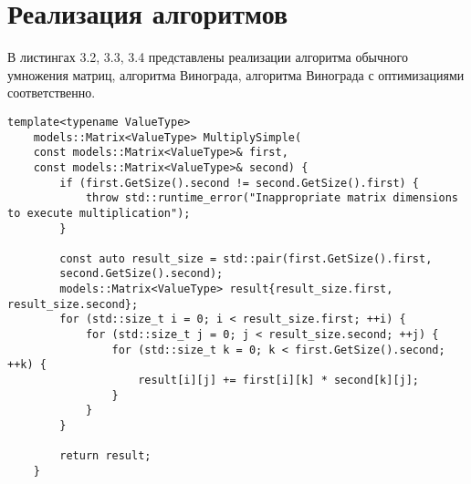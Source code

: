 \section{Реализация алгоритмов}

В листингах 3.2, 3.3, 3.4 представлены реализации алгоритма обычного умножения матриц, алгоритма Винограда, алгоритма Винограда с оптимизациями соответственно.

\begin{lstlisting}[caption=Функция стандартного умножения матриц]
	template<typename ValueType>
	models::Matrix<ValueType> MultiplySimple(
	const models::Matrix<ValueType>& first,
	const models::Matrix<ValueType>& second) {
		if (first.GetSize().second != second.GetSize().first) {
			throw std::runtime_error("Inappropriate matrix dimensions to execute multiplication");
		}
		
		const auto result_size = std::pair(first.GetSize().first,
		second.GetSize().second);
		models::Matrix<ValueType> result{result_size.first, result_size.second};
		for (std::size_t i = 0; i < result_size.first; ++i) {
			for (std::size_t j = 0; j < result_size.second; ++j) {
				for (std::size_t k = 0; k < first.GetSize().second; ++k) {
					result[i][j] += first[i][k] * second[k][j];
				}
			}
		}
		
		return result;
	}
\end{lstlisting}

